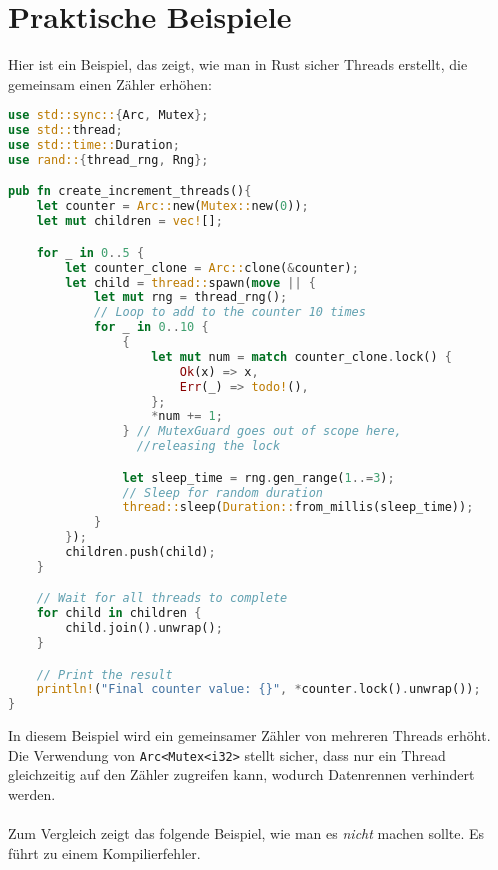 \cleardoublepage
\section{Praktische Beispiele}

Hier ist ein Beispiel, das zeigt, wie man in Rust sicher Threads erstellt, die gemeinsam einen Zähler erhöhen:

\begin{lstlisting}[language=Rust, caption=Sicheres Erstellen von Threads ]
use std::sync::{Arc, Mutex};
use std::thread;
use std::time::Duration;
use rand::{thread_rng, Rng}; 

pub fn create_increment_threads(){
    let counter = Arc::new(Mutex::new(0));
    let mut children = vec![];

    for _ in 0..5 {
        let counter_clone = Arc::clone(&counter);
        let child = thread::spawn(move || {
            let mut rng = thread_rng(); 
            // Loop to add to the counter 10 times
            for _ in 0..10 { 
                {
                    let mut num = match counter_clone.lock() {
                        Ok(x) => x,
                        Err(_) => todo!(),
                    };
                    *num += 1;
                } // MutexGuard goes out of scope here, 
                  //releasing the lock

                let sleep_time = rng.gen_range(1..=3); 
                // Sleep for random duration
                thread::sleep(Duration::from_millis(sleep_time)); 
            }
        });
        children.push(child);
    }

    // Wait for all threads to complete
    for child in children {
        child.join().unwrap();
    }

    // Print the result
    println!("Final counter value: {}", *counter.lock().unwrap());
}
\end{lstlisting}
\noindent
In diesem Beispiel wird ein gemeinsamer Zähler von mehreren Threads erhöht. 
Die Verwendung von \texttt{Arc<Mutex<i32>} stellt sicher, dass nur ein Thread gleichzeitig auf den Zähler zugreifen kann, wodurch Datenrennen verhindert werden.\\
\\
Zum Vergleich zeigt das folgende Beispiel, wie man es \emph{nicht} machen sollte. Es führt zu einem Kompilierfehler. 

